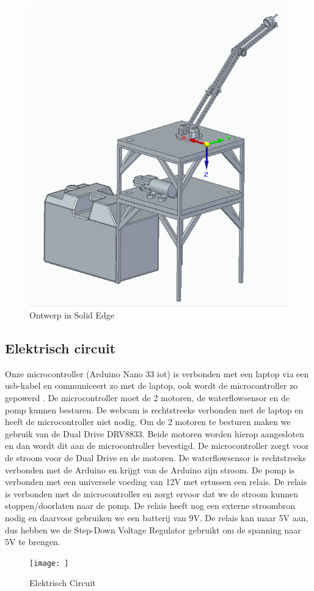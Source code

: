 \documentclass[kulak]{kulakarticle} %
\begin{document}
			\begin{figure} [!h]
				\centering
				\includegraphics[width = .6 \textwidth]{Solid Edge Assembly foto}
				\caption{Ontwerp in Solid Edge}
				\label{ontwerp}
			\end{figure}
	\subsection{Elektrisch circuit}
		Onze microcontroller (Arduino Nano 33 iot) is verbonden met een laptop via een usb-kabel en communiceert zo met de laptop, ook wordt de microcontroller zo gepowerd . De microcontroller moet de 2 motoren, de waterflowsensor en de pomp kunnen besturen. De webcam is rechtstreeks verbonden met de laptop en heeft de microcontroller niet nodig. Om de 2 motoren te besturen maken we gebruik van de Dual Drive DRV8833. Beide motoren worden hierop aangesloten en dan wordt dit aan de microcontroller bevestigd. De microcontroller zorgt voor de stroom voor de Dual Drive en de motoren. De waterflowsensor is rechtstreeks verbonden met de Arduino en krijgt van de Arduino zijn stroom. De pomp is verbonden met een universele voeding van 12V met ertussen een relais. De relais is verbonden met de microcontroller en zorgt ervoor dat we de stroom kunnen stoppen/doorlaten naar de pomp. De relais heeft nog een externe stroombron nodig en daarvoor gebruiken we een batterij van 9V. De relais kan maar 5V aan, dus hebben we de Step-Down Voltage Regulator gebruikt om de spanning naar 5V te brengen. 
		
			\begin{figure} [!h]
			\centering
			\texttt{[image: ]}
			\caption{Elektrisch Circuit}
			\label{elektriek}
		\end{figure}
		
\end{document}
